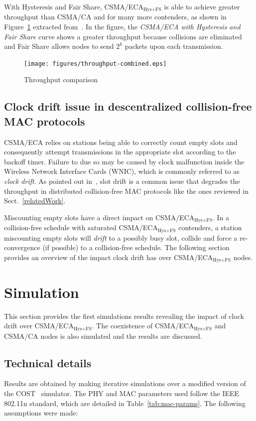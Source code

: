 \documentclass[a4paper,journal]{IEEEtran}
\begin{document}
	With Hysteresis and Fair Share, CSMA/ECA$_{\text{Hys+FS}}$ is able to achieve greater throughput than CSMA/CA and for many more contenders, as shown in Figure~\ref{fig:ECA+H+F-throughput} extracted from~\cite{research2standards}. In the figure, the \emph{CSMA/ECA with Hysteresis and Fair Share} curve shows a greater throughput because collisions are eliminated and Fair Share allows nodes to send $2^{k}$ packets upon each transmission.

	\begin{figure}[htbp]
	\centering
		\texttt{[image: figures/throughput-combined.eps]}
		\caption{Throughput comparison~\cite{research2standards}}
		\label{fig:ECA+H+F-throughput}
	\end{figure}
	
	\subsection{Clock drift issue in descentralized collision-free MAC protocols}
	CSMA/ECA relies on stations being able to correctly count empty slots and consequently attempt transmissions in the appropriate slot according to the backoff timer. Failure to due so may be caused by clock malfunction inside the Wireless Network Interface Cards (WNIC), which is commonly referred to as \emph{clock drift}. As pointed out in~\cite{slotDrift}, slot drift is a common issue that degrades the throughput in distributed collision-free MAC protocols like the ones reviewed in Sect.~\ref{relatedWork}.
	
	Miscounting empty slots have a direct impact on CSMA/ECA$_{\text{Hys+FS}}$. In a collision-free schedule with saturated CSMA/ECA$_{\text{Hys+FS}}$ contenders, a station miscounting empty slots will \emph{drift} to a possibly busy slot, collide and force a re-convergence (if possible) to a collision-free schedule. The following section provides an overview of the impact clock drift has over CSMA/ECA$_{\text{Hys+FS}}$ nodes.
	
\section{Simulation}\label{simulations}
This section provides the first simulations results revealing the impact of clock drift over CSMA/ECA$_{\text{Hys+FS}}$. The coexistence of CSMA/ECA$_{\text{Hys+FS}}$ and CSMA/CA nodes is also simulated and the results are discussed.

	\subsection{Technical details}
	Results are obtained by making iterative simulations over a modified version of the COST~\cite{COST} simulator. The PHY and MAC parameters used follow the IEEE 802.11n standard, which are detailed in Table~\ref{tab:mac-params}. The following assumptions were made:
	
\end{document}
